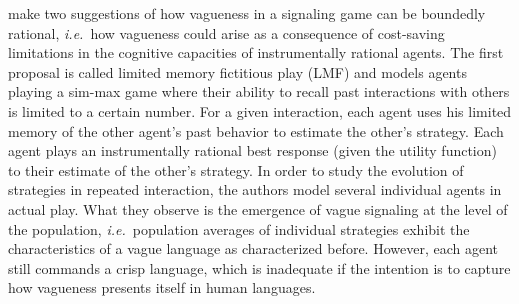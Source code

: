 \documentclass[a4paper]{article}
\begin{document}
\textcite{franke_vagueness_2011} make two suggestions of how vagueness in a signaling game can be boundedly rational, \emph{i.e.}~how vagueness could arise as a consequence of cost-saving limitations in the cognitive capacities of instrumentally rational agents.
The first proposal is called limited memory fictitious play (LMF) and models agents playing a sim-max game where their ability to recall past interactions with others is limited to a certain number.
For a given interaction, each agent uses his limited memory of the other agent's past behavior to estimate the other's strategy.
Each agent plays an instrumentally rational best response (given the utility function) to their estimate of the other's strategy.
In order to study the evolution of strategies in repeated interaction, the authors model several individual agents in actual play.
What they observe is the emergence of vague signaling at the level of the population, \emph{i.e.}~population averages of individual strategies exhibit the characteristics of a vague language as characterized before.
However, each agent still commands a crisp language, which is inadequate if the intention is to capture how vagueness presents itself in human languages.
\end{document}
